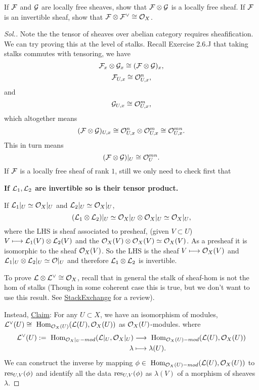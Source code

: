\documentclass[11pt]{book} %
\begin{document}
\begin{exr}\label{chap13exr:tensor_product_of_invertible_sheaves}
If ${\cal F}$ and ${\cal G}$ are locally free sheaves, show that ${\cal F}\otimes {\cal G}$ is a locally free sheaf.  If ${\cal F}$ is an invertible sheaf, show that ${\cal F}\otimes {\cal F}^\vee\cong {\cal O}_X$.
\end{exr}
\begin{proof}[Sol.]
Note the the tensor of sheaves over abelian category requires sheafification. We can try proving this at the level of stalks. Recall Exercise 2.6.J that taking stalks commutes with tensoring, we have
$$
{\cal F}_{x}\otimes{\cal G}_{x}\cong ({\cal F}\otimes {\cal G})_{x},
$$
$$
{\cal F}_{U,x}\cong{\cal O}_{U,x}^n,
$$
and
$$
{\cal G}_{U,x}\cong {\cal O}_{U,x}^m,
$$
which altogether means 
$$
({\cal F}\otimes {\cal G})_{U,x}\cong {\cal O}_{U,x}^n\otimes {\cal O}_{U,x}^m\cong {\cal O}_{U,x}^{mn}.
$$
This in turn means
$$
({\cal F}\otimes {\cal G})|_U\cong {\cal O}_{U}^{mn} .
$$
If ${\cal F}$ is a locally free sheaf of rank $1$, still we only need to check first that

\textbf{If ${\cal L}_1,{\cal L}_2$ are invertible so is their tensor product.} 

If ${\cal L}_1|_U\simeq {\cal O}_X|_U$ and ${\cal L}_2|_U\simeq {\cal O}_X|_U$,  
$$
({\cal L}_1\otimes{\cal L}_2)|_U\simeq {\cal O}_X|_U\otimes{\cal O}_X|_U\simeq {\cal O}_X|_U,
$$ where the LHS is sheaf associated to presheaf, (given $V\subset U$) $V\longmapsto{\cal L}_1(V)\otimes{\cal L}_2(V)$ and the ${\cal O}_X(V)\otimes {\cal O}_X(V)\simeq {\cal O}_X(V)$. As a presheaf it is isomorphic to the sheaf ${\cal O}_{X}(V)$. So the LHS is the sheaf $V\longmapsto {\cal O}_X(V)$ and ${\cal L}_1|_U\otimes {\cal L}_2|_U\simeq {\cal O}|_U$ and therefore ${\cal L}_1\otimes {\cal L}_2$ is invertible.

To prove ${\cal L}\otimes {\cal L}^\vee\cong {\cal O}_X$, recall that in general the stalk of sheaf-hom is not the hom of stalks (Though in some coherent case this is true, but we don't want to use this result. See \href{https://mathoverflow.net/questions/642/stalks-of-sheaf-hom}{StackExchange} for a review).

Instead,
\underline{Claim}: For any $U\subset X$, we have an isomorphism of modules, ${\cal L}^\vee(U)\cong \text{ Hom}_{{\cal O}_X(U)}({\cal L}(U),{\cal O}_X(U))$ as ${\cal O}_X(U)$-modules.
where 
$$
\begin{aligned}
{\cal L}^\vee(U):=\text{ Hom}_{{\cal O}_X|_U-mod}({\cal L}|_U,{\cal O}_X|_U)&\longrightarrow \text{ Hom}_{{\cal O}_X(U)-mod}({\cal L}(U),{\cal O}_X(U))\\
\lambda&\longmapsto \lambda(U).
\end{aligned}
$$
We can construct the inverse by mapping $\phi\in \text{ Hom}_{{\cal O}_X(U)-mod}({\cal L}(U),{\cal O}_X(U))$ to $\text{res}_{U,V}(\phi)$ and identify all the data $\text{res}_{U,V}(\phi)$ as $\lambda(V)$ of a morphism of sheaves $\lambda$.


\end{proof}
\end{document}
